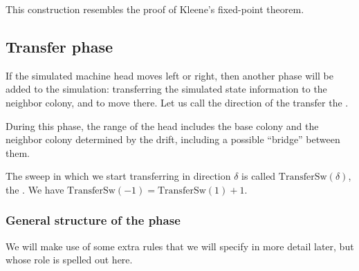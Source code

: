 \documentclass[12pt]{memoir}
\newcommand{\TransferSw}{\mathrm{TransferSw}}
\begin{document}
\begin{remark}
This construction resembles the proof of Kleene's fixed-point theorem.
\end{remark}



\subsection{Transfer phase}\label{sec:TransferPhase}

If the simulated machine head moves left or right, then another phase will
be added to the simulation: transferring the simulated state information to the
neighbor colony, and to move there.
Let us call the direction of the transfer the .

During this phase, the range of the head
includes the base colony and the neighbor colony
determined by the drift, including a possible ``bridge'' between them.

The sweep in which we start transferring in direction \( \delta \) is called
\( \TransferSw(\delta) \), the .
We have \( \TransferSw(-1) =\TransferSw(1)+1 \).

\subsubsection{General structure of the phase}\label{sec:TransferPhase.general-struc}

We will make use of some extra rules that we will
specify in more detail later, but whose role is spelled out here.
\end{document}
